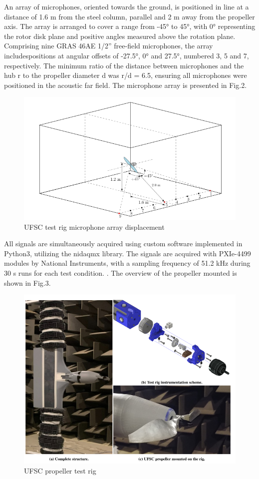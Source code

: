 \documentclass[10pt,fleqn,a4paper,twoside]{article}
\begin{document}
An array of microphones, oriented towards the ground, is positioned in line at a distance of 1.6 m from the steel column, parallel and 2 m away from the propeller axis. The array is arranged to cover a range from -45° to 45°, with 0° representing the rotor disk plane and positive angles measured above the rotation plane. Comprising nine GRAS 46AE 1/2” free-field microphones, the array includespositions at angular offsets of -27.5°, 0° and 27.5°, numbered 3, 5 and 7, respectively. The minimum ratio of the distance between microphones and the hub r to the propeller diameter d was r/d = 6.5, ensuring all microphones were positioned in the acoustic far field. The microphone array is presented in Fig.2.
\clearpage
\begin{figure}[h!]
    \centering
    \includegraphics[angle=0, scale=0.320]{Figures/ufsc_microphone_array.png}
    \caption{UFSC test rig microphone array displacement}
    \label{fig2}
    \end{figure}

All signals are simultaneously acquired using custom software implemented in Python3, utilizing the nidaqmx
library. The signals are acquired with PXIe-4499 modules by National Instruments, with a sampling frequency of 51.2 kHz during 30 s runs for each test condition. \citep{Augusto}. The overview of the propeller mounted is shown in Fig.3.
\begin{figure}[h!]
    \centering
    \includegraphics[angle=0, scale=0.320]{Figures/UFSC_propeller_test_rig.png}
    \caption{UFSC propeller test rig}
    \label{fig3}
    \end{figure}
\end{document}
